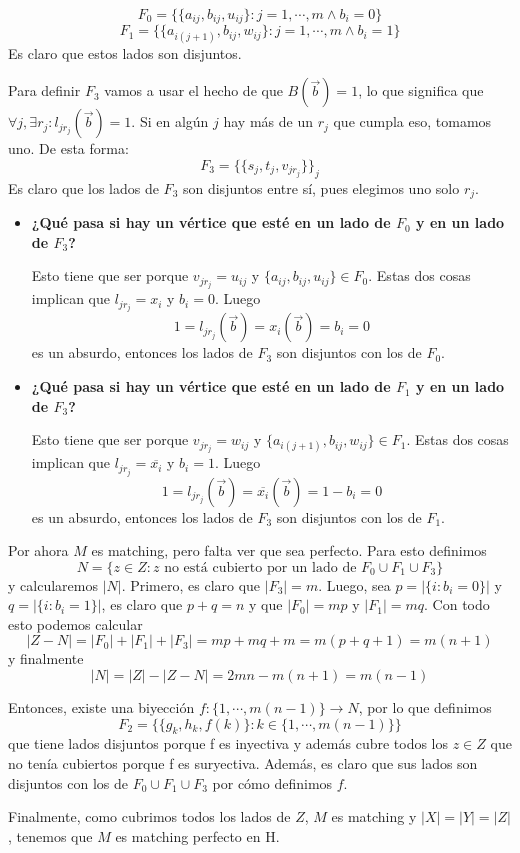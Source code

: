 \documentclass[11pt, a4paper]{article}
\theoremstyle{definition}
\begin{document}
      \[ F_0 = \{ \{a_{ij}, b_{ij}, u_{ij}\} : j = 1, \cdots, m \land b_i = 0 \} \]
      \[ F_1 = \{ \{a_{i(j+1)}, b_{ij}, w_{ij}\} : j = 1, \cdots, m \land b_i = 1 \} \]
Es claro que estos lados son disjuntos.

Para definir \(F_3\) vamos a usar el hecho de que \(B(\overrightarrow{b}) = 1\), lo que significa que \({ \forall j, \exists r_j : l_{jr_j}(\overrightarrow{b}) = 1 .}\) Si en algún \(j\) hay más de un \(r_j\) que cumpla eso, tomamos uno. De esta forma:
      \[ F_3 = \{ \{ s_j, t_j, v_{jr_j} \} \}_j \]
Es claro que los lados de \(F_3\) son disjuntos entre sí, pues elegimos uno solo \(r_j\).

\begin{itemize}
\item \textbf{¿Qué pasa si hay un vértice que esté en un lado de \(F_0\) y en un lado de \(F_3\)?}

Esto tiene que ser porque \(v_{jr_j} = u_{ij}\) y \(\{a_{ij}, b_{ij}, u_{ij}\} \in F_0\). Estas dos cosas implican que \(l_{jr_j} = x_i\) y \(b_i = 0\). Luego
	  \[ 1 = l_{jr_j}(\overrightarrow{b}) = x_i(\overrightarrow{b}) = b_i = 0 \]
es un absurdo, entonces los lados de \(F_3\) son disjuntos con los de \(F_0\).

\item \textbf{¿Qué pasa si hay un vértice que esté en un lado de \(F_1\) y en un lado de \(F_3\)?}

Esto tiene que ser porque \(v_{jr_j} = w_{ij}\) y \(\{a_{i(j+1)}, b_{ij}, w_{ij}\} \in F_1\). Estas dos cosas implican que \(l_{jr_j} = \overline{x_i}\) y \(b_i = 1\). Luego
	  \[ 1 = l_{jr_j}(\overrightarrow{b}) = \overline{x_i}(\overrightarrow{b}) = 1 - b_i = 0 \]
es un absurdo, entonces los lados de \(F_3\) son disjuntos con los de \(F_1\).
\end{itemize}

Por ahora \(M\) es matching, pero falta ver que sea perfecto. Para esto definimos
      \[ N = \{z \in Z : z \text{ no está cubierto por un lado de } F_0 \cup F_1 \cup F_3 \} \]
y calcularemos \(|N|\). Primero, es claro que \(|F_3|=m\). Luego, sea \(p = |\{i : b_i = 0\}|\) y \(q = |\{i : b_i = 1\}|\), es claro que \(p+q = n\) y que \(|F_0| = mp\) y \(|F_1| = mq\). Con todo esto podemos calcular
      \[ |Z - N| = |F_0| + |F_1| + |F_3| = mp + mq + m = m(p+q+1) = m(n+1) \]
y finalmente
      \[ |N| = |Z| - |Z-N| = 2mn - m(n+1) = m(n-1) \]

Entonces, existe una biyección \(f: \{1, \cdots, m(n-1)\} \rightarrow N\), por lo que definimos
      \[ F_2 = \{\{g_k, h_k, f(k)\} : k \in \{1, \cdots, m(n-1)\} \} \]
que tiene lados disjuntos porque f es inyectiva y además cubre todos los \(z \in Z\) que no tenía cubiertos porque f es suryectiva. Además, es claro que sus lados son disjuntos con los de \(F_0 \cup F_1 \cup F_3\) por cómo definimos \(f\).

Finalmente, como cubrimos todos los lados de \(Z\), \(M\) es matching y \(|X| = |Y| = |Z|\), tenemos que \(M\) es matching perfecto en H.
\end{document}
